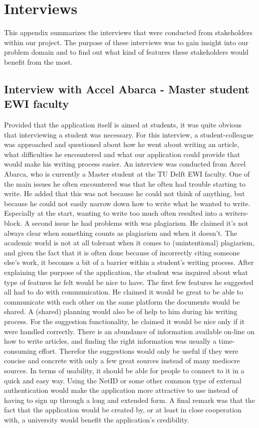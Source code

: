 \chapter{Interviews}   
\label{interview} 
 This appendix summarizes the interviews that were conducted from stakeholders within our project. The purpose of these interviews was to gain insight into our problem domain and to find out what kind of features these stakeholders would benefit from the most.

\section{Interview with Accel Abarca - Master student EWI faculty}
Provided that the application itself is aimed at students, it was quite obvious that interviewing a student was necessary. For this interview, a student-colleague was approached and questioned about how he went about writing an article, what difficulties he encountered and what our application could provide that would make his writing process easier. An interview was conducted from Accel Abarca, who is currently a Master student at the TU Delft EWI faculty. One of the main issues he often encountered was that he often had trouble starting to write. He added that this was not because he could not think of anything, but because he could not easily narrow down how to write what he wanted to write. Especially at the start, wanting to write too much often resulted into a writers-block. A second issue he had problems with was plagiarism. He claimed it's not always clear when something counts as plagiarism and when it doesn't. The academic world is not at all tolerant when it comes to (unintentional) plagiarism, and given the fact that it is often done because of incorrectly citing someone else's work, it becomes a bit of a barrier within a student's writing process. After explaining the purpose of the application, the student was inquired about what type of features he felt would be nice to have. The first few features he suggested all had to do with communication. He claimed it would be great to be able to communicate with each other on the same platform the documents would be shared. A (shared) planning would also be of help to him during his writing process. For the suggestion functionality, he claimed it would be nice only if it were handled correctly. There is an abundance of information available on-line on how to write articles, and finding the right information was usually a time-consuming effort. Therefor the suggestions would only be useful if they were concise and concrete with only a few great sources instead of many mediocre sources. In terms of usability, it should be able for people to connect to it in a quick and easy way. Using the NetID or some other common type of external authentication would make the application more attractive to use instead of having to sign up through a long and extended form. A final remark was that the fact that the application would be created by, or at least in close cooperation with, a university would benefit the application's credibility.

